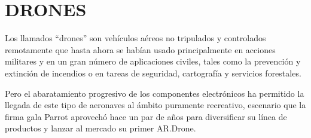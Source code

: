 \documentclass[12pt]{article}
\begin{document}
\vspace{30pt}
\section{DRONES}

Los llamados “drones” son vehículos aéreos no tripulados y controlados remotamente que hasta ahora se habían usado principalmente en acciones militares y en un gran número de aplicaciones civiles, tales como la prevención y extinción de incendios o en tareas de seguridad, cartografía y servicios forestales.

Pero el abaratamiento progresivo de los componentes electrónicos ha permitido la llegada de este tipo de aeronaves al ámbito puramente recreativo, escenario que la firma gala Parrot aprovechó hace un par de años para diversificar su línea de productos y lanzar al mercado su primer AR.Drone.

 
\end{document}
